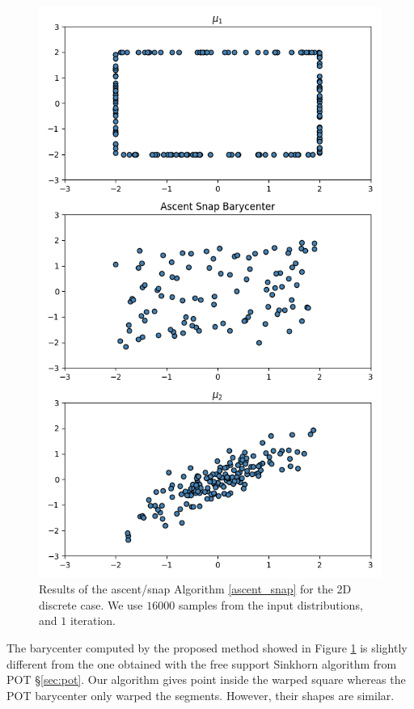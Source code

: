 \begin{figure}
    \centering
    \includegraphics[width=\textwidth]{figures/ascent_snap_2D_discrete_barycenter.png}
    \caption{Results of the ascent/snap Algorithm \ref{ascent_snap} for the 2D discrete case. We use $16000$ samples from the input distributions, and $1$ iteration.}
    \label{fig:ascent_snap_2D_discrete}
\end{figure}

The barycenter computed by the proposed method showed in Figure \ref{fig:ascent_snap_2D_discrete} is slightly different from the one obtained with the free support Sinkhorn algorithm from POT \S\ref{sec:pot}. Our algorithm gives point inside the warped square whereas the POT barycenter only warped the segments. However, their shapes are similar. 

